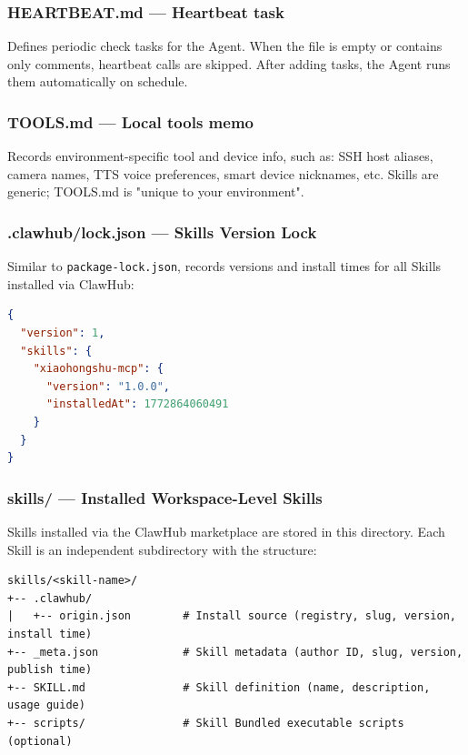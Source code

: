 \subsubsection{HEARTBEAT.md --- Heartbeat task}


Defines periodic check tasks for the Agent. When the file is empty or contains only comments, heartbeat calls are skipped. After adding tasks, the Agent runs them automatically on schedule.

\subsubsection{TOOLS.md --- Local tools memo}


Records environment-specific tool and device info, such as: SSH host aliases, camera names, TTS voice preferences, smart device nicknames, etc. Skills are generic; TOOLS.md is "unique to your environment".

\subsubsection{.clawhub/lock.json --- Skills Version Lock}


Similar to \texttt{package-lock.json}, records versions and install times for all Skills installed via ClawHub:

\begin{lstlisting}[language=json]
{
  "version": 1,
  "skills": {
    "xiaohongshu-mcp": {
      "version": "1.0.0",
      "installedAt": 1772864060491
    }
  }
}
\end{lstlisting}

\subsubsection{skills/ --- Installed Workspace-Level Skills}


Skills installed via the ClawHub marketplace are stored in this directory. Each Skill is an independent subdirectory with the structure:

\begin{lstlisting}
skills/<skill-name>/
+-- .clawhub/
|   +-- origin.json        # Install source (registry, slug, version, install time)
+-- _meta.json             # Skill metadata (author ID, slug, version, publish time)
+-- SKILL.md               # Skill definition (name, description, usage guide)
+-- scripts/               # Skill Bundled executable scripts (optional)
\end{lstlisting}

